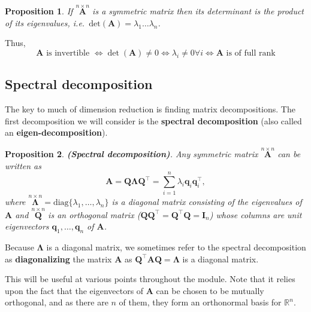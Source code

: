 \documentclass[]{book}
\newtheorem{proposition}{Proposition}[chapter]
\theoremstyle{definition}
\theoremstyle{definition}
\theoremstyle{definition}
\theoremstyle{remark}
\begin{document}
\begin{proposition}
\protect\hypertarget{prp:deteig}{}{\label{prp:deteig} }If \(\stackrel{n\times n}{\mathbf A}\) is a symmetric matrix
then its determinant is the product of its eigenvalues, i.e.~\(\text{det}({\mathbf A})=\lambda _1 \dots \lambda _n\).
\end{proposition}

Thus,
\[\boldsymbol A\mbox{ is invertible } \iff  \det(\boldsymbol A)\not=0 \iff 
\lambda_i\not=0 \forall i \iff \boldsymbol A\mbox{ is of full rank}\]

\hypertarget{spectral-decomposition}{%
\subsection{Spectral decomposition}\label{spectral-decomposition}}

The key to much of dimension reduction is finding matrix decompositions. The first decomposition we will consider is the \textbf{spectral decomposition} (also called an \textbf{eigen-decomposition}).

\begin{proposition}
\protect\hypertarget{prp:spectraldecomp}{}{\label{prp:spectraldecomp} }\textbf{(Spectral decomposition)}. Any symmetric matrix \(\stackrel{n\times n}{\mathbf A}\) can
be written as
\[ {\mathbf A}={\mathbf Q} {\mathbf\Lambda} \boldsymbol Q^\top = \sum _{i=1}^{n} \lambda _i {\mathbf q}_i {\mathbf q}_i^\top ,\]
where \(\stackrel{n\times n}{\mathbf \Lambda}=\text{diag}\{ \lambda _1, \dots , \lambda _n \}\) is
a diagonal matrix consisting of the eigenvalues of \(\mathbf A\) and \(\stackrel{n\times n}{\mathbf Q}\) is
an orthogonal matrix (\(\boldsymbol Q\boldsymbol Q^\top=\boldsymbol Q^\top \boldsymbol Q=\mathbf I_n\)) whose columns are unit eigenvectors
\({\mathbf q}_1, \dots , {\mathbf q}_n\) of \(\mathbf A\).
\end{proposition}

Because \(\boldsymbol \Lambda\) is a diagonal matrix, we sometimes refer to the spectral decomposition as \textbf{diagonalizing} the matrix \(\boldsymbol A\) as \(\boldsymbol Q^\top\boldsymbol A\boldsymbol Q=\boldsymbol \Lambda\) is a diagonal matrix.

This will be useful at various points throughout the module. Note that it relies upon the fact that the eigenvectors of \(\boldsymbol A\) can be chosen to be mutually orthogonal, and as there are \(n\) of them, they form an orthonormal basis for \(\mathbb{R}^n\).
\end{document}
